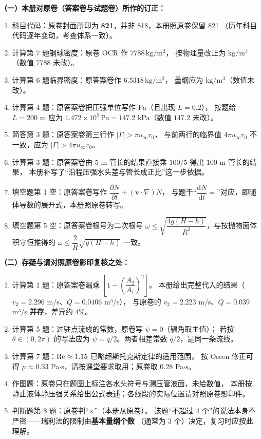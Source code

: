 \begin{tishi}
\textbf{（一）本册对原卷（答案卷与试题卷）所作的订正：}
\begin{enumerate}
  \item 科目代码：原卷封面所印为 \textbf{821}，并非 818，本册照原卷保留 821
        （历年科目代码逐年变动，考查体系一致）。
  \item 计算第 7 题钢球密度：原卷 OCR 作 $7788\,\mathrm{kg/m^{2}}$，
        按物理量改正为 $\mathrm{kg/m^{3}}$（数值 $7788$ 未改）。
  \item 计算第 6 题临界密度：原答案卷作 $6.5318\,\mathrm{kg/m^{2}}$，
        量纲应为 $\mathrm{kg/m^{3}}$（数值未改）。
  \item 计算第 4 题：原答案卷把压强单位写作 Pa（且出现 $L=0.2$），
        按题给 $L=200$ m 应为 $1.472\times10^{5}\,\mathrm{Pa}=147.2$ kPa（数值 $147.2$ 未改）。
  \item 简答第 3 题：原答案卷第三行作 $|\Gamma|>\pi u_\infty r_0$，
        与前两行的临界值 $4\pi u_\infty r_0$ 不一致，应为 $|\Gamma|>4\pi u_\infty r_0$。
  \item 计算第 3 题：原答案卷由 $5$ m 管长的结果直接乘 $100/5$ 得出 $100$ m 管长的结果，
        本册补写了“沿程压强水头差与管长成正比”这一步依据。
  \item 填空题第 1 空：原答案卷写作 $\dfrac{\partial N}{\partial t}+(\bm v\cdot\nabla)N$，
        与题干“$\dfrac{\mathrm dN}{\mathrm dt}=$”对应，即随体导数的展开式，本册照原卷转写。
  \item 填空题第 5 空：原答案卷根号为二次根号
        $\omega\le\sqrt{\dfrac{4g(H-h)}{R^{2}}}$，与按抛物面体积守恒推得的
        $\omega\le\dfrac{2}{R}\sqrt{g(H-h)}$ 一致。
\end{enumerate}

\textbf{（二）存疑与请对照原卷影印复核之处：}
\begin{enumerate}
  \item 计算第 1 题：原答案卷漏乘 $\left[1-\left(\dfrac{A_2}{A_1}\right)^{2}\right]$。
        本册给出完整代入的结果（$v_2=2.296$ m/s、$Q=0.0406$ m³/s），
        与原卷的 $v_2=2.223$ m/s、$Q=0.039$ m³/s \textbf{并存}，差异约 $4\%$。
  \item 计算第 5 题：过驻点流线的常数，原卷写 $\psi=0$（辐角取主值）；
        若按 $\theta\in(0,2\pi)$ 的写法应为 $\psi=q/2$。两者相差常数 $q/2$，是同一条流线。
  \item 计算第 7 题：$\mathrm{Re}\approx1.15$ 已略超斯托克斯定律的适用范围，
        按 Oseen 修正可得 $\mu\approx0.33$ Pa$\cdot$s，请按课堂要求取用；原卷取 $0.28$ Pa$\cdot$s。
  \item 作图题：原卷只在题图上标注各水头符号与测压管液面，未给数值，
        本册按静止液体静压强关系给出公式表述；各线段的实际位置请对照原卷影印件。
  \item 判断题第 8 题：原卷判“$\times$”（本册从原卷）。
        该题“不超过 4 个”的说法本身不严密——瑞利法的限制由\textbf{基本量纲个数}
        （通常为 3 个）决定，复习时应按此理解。
\end{enumerate}
\end{tishi}
